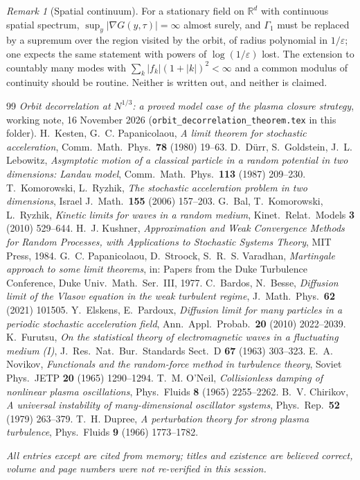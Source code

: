 \documentclass[11pt]{article}
\newcommand{\eps}{\varepsilon}
\theoremstyle{remark}
\newtheorem{remark}[theorem]{Remark}
\begin{document}
\begin{remark}[Spatial continuum]
For a stationary field on $\mathbb{R}^d$ with continuous spatial spectrum,
$\sup_y|\nabla G(y,\tau)| = \infty$ almost surely, and $\Gamma_1$ must be
replaced by a supremum over the region visited by the orbit, of radius
polynomial in $1/\eps$; one expects the same statement with powers of
$\log(1/\eps)$ lost. The extension to countably many modes with
$\sum_k|f_k|(1+|k|)^2<\infty$ and a common modulus of continuity should be
routine. Neither is written out, and neither is claimed.
\end{remark}

\begin{thebibliography}{99}
 \emph{Orbit decorrelation at $N^{1/3}$: a proved model case
of the plasma closure strategy}, working note, 16 November 2026
(\texttt{orbit\_decorrelation\_theorem.tex} in this folder).
 H.~Kesten, G.~C. Papanicolaou, \emph{A limit theorem for
stochastic acceleration}, Comm.\ Math.\ Phys.\ \textbf{78} (1980) 19--63.
 D.~D\"urr, S.~Goldstein, J.~L. Lebowitz, \emph{Asymptotic
motion of a classical particle in a random potential in two dimensions:
Landau model}, Comm.\ Math.\ Phys.\ \textbf{113} (1987) 209--230.
 T.~Komorowski, L.~Ryzhik, \emph{The stochastic acceleration
problem in two dimensions}, Israel J.\ Math.\ \textbf{155} (2006) 157--203.
 G.~Bal, T.~Komorowski, L.~Ryzhik, \emph{Kinetic limits for
waves in a random medium}, Kinet.\ Relat.\ Models \textbf{3} (2010) 529--644.
 H.~J. Kushner, \emph{Approximation and Weak Convergence
Methods for Random Processes, with Applications to Stochastic Systems
Theory}, MIT Press, 1984.
 G.~C. Papanicolaou, D.~Stroock, S.~R.~S. Varadhan,
\emph{Martingale approach to some limit theorems}, in: Papers from the Duke
Turbulence Conference, Duke Univ.\ Math.\ Ser.\ III, 1977.
 C.~Bardos, N.~Besse, \emph{Diffusion limit of the
Vlasov equation in the weak turbulent regime}, J.\ Math.\ Phys.\ \textbf{62}
(2021) 101505.
 Y.~Elskens, E.~Pardoux, \emph{Diffusion limit for
many particles in a periodic stochastic acceleration field}, Ann.\ Appl.\
Probab.\ \textbf{20} (2010) 2022--2039.
 K.~Furutsu, \emph{On the statistical theory of
electromagnetic waves in a fluctuating medium (I)}, J.\ Res.\ Nat.\ Bur.\
Standards Sect.\ D \textbf{67} (1963) 303--323.
\bibitem{Novikov} E.~A. Novikov, \emph{Functionals and the random-force
method in turbulence theory}, Soviet Phys.\ JETP \textbf{20} (1965)
1290--1294.
\bibitem{ONeil65} T.~M. O'Neil, \emph{Collisionless damping of nonlinear
plasma oscillations}, Phys.\ Fluids \textbf{8} (1965) 2255--2262.
\bibitem{Chirikov} B.~V. Chirikov, \emph{A universal instability of
many-dimensional oscillator systems}, Phys.\ Rep.\ \textbf{52} (1979)
263--379.
\bibitem{Dupree} T.~H. Dupree, \emph{A perturbation theory for strong plasma
turbulence}, Phys.\ Fluids \textbf{9} (1966) 1773--1782.
\end{thebibliography}
\noindent\emph{All entries except \cite{Note} are cited from memory; titles
and existence are believed correct, volume and page numbers were not
re-verified in this session.}
\end{document}
